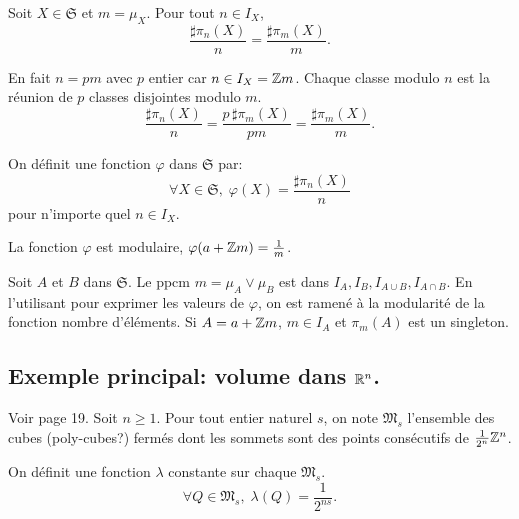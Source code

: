 \begin{lem}
  Soit $X\in \mathfrak{S}$ et $m=\mu_X$. Pour tout $n\in I_X$,
  \begin{displaymath}
      \frac{\sharp \pi_n(X)}{n} = \frac{\sharp \pi_m(X)}{m}.    
  \end{displaymath}
\end{lem}
\begin{demo}
  En fait $n = pm$ avec $p$ entier car $n \in I_X = \mathbb{Z} m$. Chaque classe modulo $n$ est la réunion de $p$ classes disjointes modulo $m$.
  \begin{displaymath}
    \frac{\sharp \pi_n(X)}{n} = \frac{p \, \sharp \pi_m(X)}{ p m} = \frac{\sharp \pi_m(X)}{m}.  
  \end{displaymath}
\end{demo}
\begin{defi}
  On définit une fonction $\varphi$ dans $\mathfrak{S}$ par:
  \begin{displaymath}
    \forall X \in \mathfrak{S}, \; \varphi(X) = \frac{\sharp \pi_n(X)}{n}
  \end{displaymath}
pour n'importe quel $n\in I_X$.
\end{defi}
\begin{prop}
  La fonction $\varphi$ est modulaire, $\varphi(a + \mathbb{Z} m) = \frac{1}{m}$.
\end{prop}
\begin{demo}
  Soit $A$ et $B$ dans $\mathfrak{S}$. Le ppcm $m = \mu_A \vee \mu_B$ est dans $I_A, I_B, I_{A\cup B}, I_{A\cap B}$. En l'utilisant pour exprimer les valeurs de $\varphi$, on est ramené à la modularité de la fonction nombre d'éléments.\newline
  Si $A= a + \mathbb{Z} m$, $m \in I_A$ et $\pi_m(A)$ est un singleton. 
\end{demo}


\subsection{Exemple principal: volume dans $\mathbb{R}^n$.}
Voir page 19.
Soit $n\geq 1$. Pour tout entier naturel $s$, on note $\mathfrak{M}_s$ l'ensemble des cubes (poly-cubes?) fermés dont les sommets sont des points consécutifs de $\frac{1}{2^n}\mathbb{Z}^n$.

On définit une fonction $\lambda$ constante sur chaque $\mathfrak{M}_s$.
\begin{displaymath}
  \forall Q \in \mathfrak{M}_s, \; \lambda(Q) = \frac{1}{2^{ns}}.
\end{displaymath}

